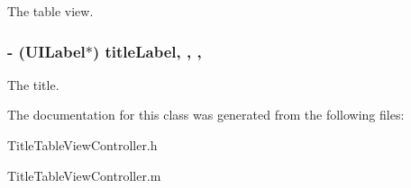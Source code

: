 The table view. \hypertarget{interface_title_table_view_controller_ac0cf26350746393ad93fae7c1dc0f071}{
\subsubsection[{title\+Label}]{\setlength{\rightskip}{0pt plus 5cm}-\/ (U\+I\+Label$\ast$) title\+Label\hspace{0.3cm}{\ttfamily [read]}, {\ttfamily [write]}, {\ttfamily [nonatomic]}, {\ttfamily [weak]}}}\label{interface_title_table_view_controller_ac0cf26350746393ad93fae7c1dc0f071}
The title. 

The documentation for this class was generated from the following files\+:\begin{DoxyCompactItemize}
\item 
Title\+Table\+View\+Controller.\+h\item 
Title\+Table\+View\+Controller.\+m\end{DoxyCompactItemize}
